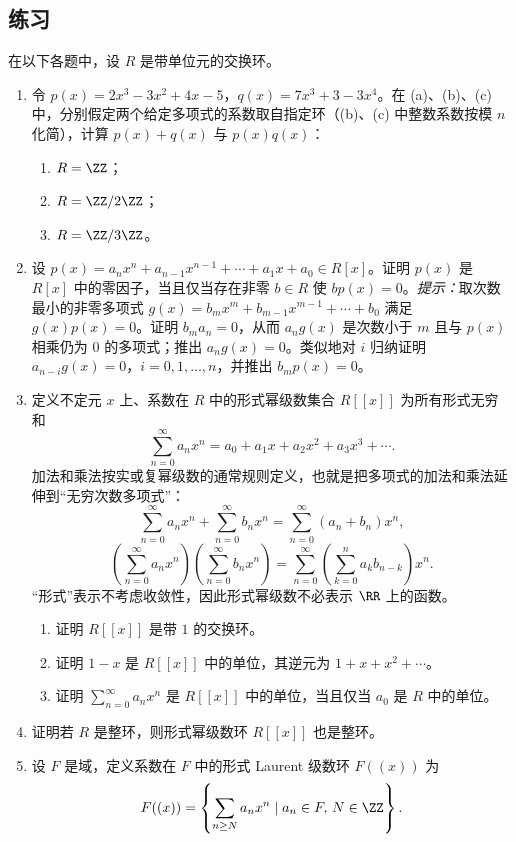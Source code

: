 \subsection*{练习}
在以下各题中，设 $R$ 是带单位元的交换环。
\begin{enumerate}[label=\arabic*.]
	\item 令 $p(x)=2x^3-3x^2+4x-5$，$q(x)=7x^3+3-3x^4$。在 (a)、(b)、(c) 中，分别假定两个给定多项式的系数取自指定环（(b)、(c) 中整数系数按模 $n$ 化简），计算 $p(x)+q(x)$ 与 $p(x)q(x)$：
	\begin{enumerate}[label=(\alph*)]
		\item $R=\ZZ$；
		\item $R=\ZZ/2\ZZ$；
		\item $R=\ZZ/3\ZZ$。
	\end{enumerate}
	\item 设 $p(x)=a_nx^n+a_{n-1}x^{n-1}+\cdots+a_1x+a_0\in R[x]$。证明 $p(x)$ 是 $R[x]$ 中的零因子，当且仅当存在非零 $b\in R$ 使 $bp(x)=0$。\emph{提示：}取次数最小的非零多项式 $g(x)=b_mx^m+b_{m-1}x^{m-1}+\cdots+b_0$ 满足 $g(x)p(x)=0$。证明 $b_ma_n=0$，从而 $a_ng(x)$ 是次数小于 $m$ 且与 $p(x)$ 相乘仍为 $0$ 的多项式；推出 $a_ng(x)=0$。类似地对 $i$ 归纳证明 $a_{n-i}g(x)=0$，$i=0,1,\ldots,n$，并推出 $b_mp(x)=0$。
	\item 定义不定元 $x$ 上、系数在 $R$ 中的形式幂级数集合 $R[[x]]$ 为所有形式无穷和
	\[
	\sum_{n=0}^{\infty}a_nx^n=a_0+a_1x+a_2x^2+a_3x^3+\cdots .
	\]
	加法和乘法按实或复幂级数的通常规则定义，也就是把多项式的加法和乘法延伸到“无穷次数多项式”：
	\[
	\sum_{n=0}^\infty a_nx^n+\sum_{n=0}^\infty b_nx^n=\sum_{n=0}^\infty(a_n+b_n)x^n,
	\]
	\[
	\left(\sum_{n=0}^\infty a_nx^n\right)\left(\sum_{n=0}^\infty b_nx^n\right)
	=\sum_{n=0}^\infty\left(\sum_{k=0}^n a_kb_{n-k}\right)x^n.
	\]
	“形式”表示不考虑收敛性，因此形式幂级数不必表示 $\RR$ 上的函数。
	\begin{enumerate}[label=(\alph*)]
		\item 证明 $R[[x]]$ 是带 $1$ 的交换环。
		\item 证明 $1-x$ 是 $R[[x]]$ 中的单位，其逆元为 $1+x+x^2+\cdots$。
		\item 证明 $\sum_{n=0}^{\infty}a_nx^n$ 是 $R[[x]]$ 中的单位，当且仅当 $a_0$ 是 $R$ 中的单位。
	\end{enumerate}
	\item 证明若 $R$ 是整环，则形式幂级数环 $R[[x]]$ 也是整环。
	\item 设 $F$ 是域，定义系数在 $F$ 中的形式 Laurent 级数环 $F((x))$ 为
	\[
	F((x))=\left\{\sum_{n\geq N}a_nx^n\mid a_n\in F,\,N\in\ZZ\right\}.
\]
\end{enumerate}
